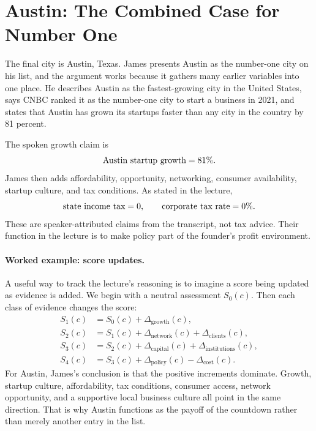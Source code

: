 \section{Austin: The Combined Case for Number One}

The final city is Austin, Texas. James presents Austin as the number-one city on his list, and the argument works because it gathers many earlier variables into one place. He describes Austin as the fastest-growing city in the United States, says CNBC ranked it as the number-one city to start a business in 2021, and states that Austin has grown its startups faster than any city in the country by 81 percent.

The spoken growth claim is
\begin{equation}
\hbox{Austin startup growth}=81\%.
\end{equation}
James then adds affordability, opportunity, networking, consumer availability, startup culture, and tax conditions. As stated in the lecture,
\begin{equation}
\hbox{state income tax}=0,
\qquad
\hbox{corporate tax rate}=0\%.
\end{equation}
These are speaker-attributed claims from the transcript, not tax advice. Their function in the lecture is to make policy part of the founder's profit environment.

\paragraph{Worked example: score updates.}
A useful way to track the lecture's reasoning is to imagine a score being updated as evidence is added. We begin with a neutral assessment \(S_0(c)\). Then each class of evidence changes the score:
\begin{align}
S_1(c) &= S_0(c)+\Delta_{\text{growth}}(c),\\
S_2(c) &= S_1(c)+\Delta_{\text{network}}(c)+\Delta_{\text{clients}}(c),\\
S_3(c) &= S_2(c)+\Delta_{\text{capital}}(c)+\Delta_{\text{institutions}}(c),\\
S_4(c) &= S_3(c)+\Delta_{\text{policy}}(c)-\Delta_{\text{cost}}(c).
\end{align}
For Austin, James's conclusion is that the positive increments dominate. Growth, startup culture, affordability, tax conditions, consumer access, network opportunity, and a supportive local business culture all point in the same direction. That is why Austin functions as the payoff of the countdown rather than merely another entry in the list.


